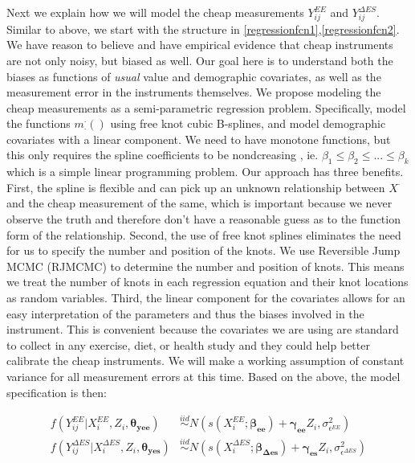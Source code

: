 \documentclass[11pt]{article}\usepackage[]{graphicx}\usepackage[]{color}
\begin{document}
Next we explain how we will model the cheap measurements $Y_{ij}^{EE}$ and $Y_{ij}^{\Delta ES}$. Similar to above, we start with the structure in \eqref{regressionfcn1},\eqref{regressionfcn2}. We have reason to believe and have empirical evidence that cheap instruments are not only noisy, but biased as well. Our goal here is to understand both the biases as functions of \emph{usual} value and demographic covariates, as well as the measurement error in the instruments themselves. We propose modeling the cheap measurements as a semi-parametric regression problem. Specifically, model the functions $m_{\cdot}^{\cdot}()$ using free knot cubic B-splines, and model demographic covariates with a linear component. We need to have monotone functions, but this only requires the spline coefficients to be nondcreasing \cite{sinha10}, ie. $\beta_1 \leq \beta_2 \leq ... \leq \beta_k$ which is a simple linear programming problem. Our approach has three benefits. First, the spline is flexible and can pick up an unknown relationship between $X^{\cdot}$ and the cheap measurement of the same, which is important because we never observe the truth and therefore don't have a reasonable guess as to the function form of the relationship. Second, the use of free knot splines eliminates the need for us to specify the number and position of the knots. We use Reversible Jump MCMC (RJMCMC) to determine the number and position of knots. This means we treat the number of knots in each regression equation and their knot locations as random variables.  Third, the linear component for the covariates allows for an easy interpretation of the parameters and thus the biases involved in the instrument. This is convenient because the covariates we are using are standard to collect in any exercise, diet, or health study and they could help better calibrate the cheap instruments.  We will make a working assumption of constant variance for all measurement errors at this time. Based on the above, the model specification is then:

\begin{align}
  f(Y_{ij}^{EE}|X_i^{EE},Z_i,\boldsymbol{\theta_{yee}}) &\overset{iid}{\sim} N(s(X_i^{EE};\boldsymbol{\beta_{ee}}) + \boldsymbol{\gamma_{ee}}Z_i,\sigma_{\epsilon^{EE}}^2) \\
    f(Y_{ij}^{\Delta ES}|X_i^{\Delta ES},Z_i,\boldsymbol{\theta_{yes}}) &\overset{iid}{\sim} N(s(X_i^{\Delta ES};\boldsymbol{\beta_{\Delta es}}) + \boldsymbol{\gamma_{es}}Z_i,\sigma_{\epsilon^{\Delta ES}}^2) \\
\end{align}
\end{document}
